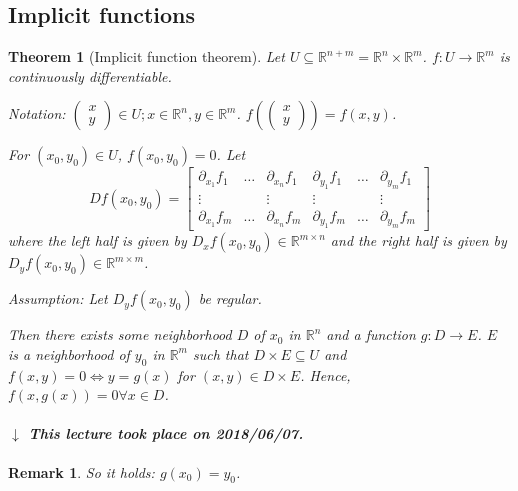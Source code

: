 \documentclass{article}
\newtheorem{theorem}{Theorem}  \numberwithin{theorem}{section}
\newtheorem{remark}{Remark}  \numberwithin{remark}{section}
\newcommand{\dateref}[1]{%
  \begin{mdframed}[backgroundcolor=gray!10,innerbottommargin=0pt,innertopmargin=0pt]
    \paragraph{\textit{$\downarrow$ This lecture took place on #1.}}%
  \end{mdframed}%
}
\newcommand{\vectwo}[2]{\begin{pmatrix} #1 \\ #2 \end{pmatrix}}
\begin{document}
\subsection{Implicit functions}
\begin{theorem}[Implicit function theorem] %
  Let $U \subseteq \mathbb R^{n + m} = \mathbb R^n \times \mathbb R^m$.
  $f: U \to \mathbb R^m$ is continuously differentiable.

  \emph{Notation:} $\vectwo xy \in U; x \in \mathbb R^n, y \in \mathbb R^m$. $f\left(\vectwo xy\right) = f(x, y)$.
  
  For $(x_0, y_0) \in U$, $f(x_0, y_0) = 0$.
  Let
  \[
    Df(x_0, y_0) = \begin{bmatrix}
      \partial_{x_1} f_1 & \dots & \partial_{x_n} f_1 & \partial_{y_1} f_1 & \dots & \partial_{y_m} f_1 \\
      \vdots & & \vdots & \vdots & & \vdots \\
      \partial_{x_1} f_m & \dots & \partial_{x_n} f_m & \partial_{y_1} f_m & \dots & \partial_{y_m} f_m
    \end{bmatrix}
  \]
  where the left half is given by $D_x f(x_0, y_0) \in \mathbb R^{m \times n}$ and the right half is given by $D_y f(x_0, y_0) \in \mathbb R^{m \times m}$.
  
  Assumption: Let $D_y f(x_0, y_0)$ be regular.
  
  Then there exists some neighborhood $D$ of $x_0$ in $\mathbb R^n$ and a function $g: D \to E$.
  $E$ is a neighborhood of $y_0$ in $\mathbb R^m$ such that $D \times E \subseteq U$ and $f(x,y) = 0 \iff y = g(x)$ for $(x, y) \in D \times E$.
  Hence, $f(x, g(x)) = 0 \forall x \in D$.
\end{theorem}

\dateref{2018/06/07}

\begin{remark}
  So it holds: $g(x_0) = y_0$.
\end{remark}
\end{document}

